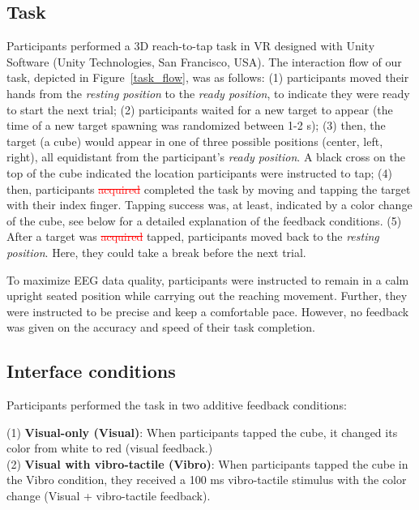 \subsection{Task}
Participants performed a 3D reach-to-tap task in VR designed with Unity Software (Unity Technologies, San Francisco, USA). The interaction flow of our task, depicted in Figure~\ref{task_flow}, was as follows: (1) participants moved their hands from the \textit{resting position} to the \textit{ready position}, to indicate they were ready to start the next trial; (2) participants waited for a new target to appear (the time of a new target spawning was randomized between 1-2 s); (3) then, the target (a cube) would appear in one of three possible positions (center, left, right), all equidistant from the participant's \textit{ready position}. \textcolor{n}{A black cross on the top of the cube indicated the location participants were instructed to tap};
(4) then, participants \textcolor{red}{\st{acquired}} \textcolor{n}{completed} the task by moving and tapping the target with their index finger. \textcolor{n}{Tapping success was, at least, indicated by a color change of the cube, see below for a detailed explanation of the feedback conditions.} (5) After a target was \textcolor{red}{\st{acquired}} \textcolor{n}{tapped}, participants moved back to the \textit{resting position}. Here, they could take a break before the next trial.

\textcolor{n}{To maximize EEG data quality, participants were instructed to remain in a calm upright seated position while carrying out the reaching movement. Further, they were instructed to be precise and keep a comfortable pace. However, no feedback was given on the accuracy and speed of their task completion.}

\subsection{Interface conditions}
Participants performed the task in two additive feedback conditions:

(1) \textbf{Visual-only (Visual)}: When participants tapped the cube, it changed its color from white to red (visual feedback.)\\
\indent(2) \textbf{Visual with vibro-tactile (Vibro)}: When participants tapped the cube in the Vibro condition, they received a 100 ms vibro-tactile stimulus with the color change (Visual + vibro-tactile feedback).


